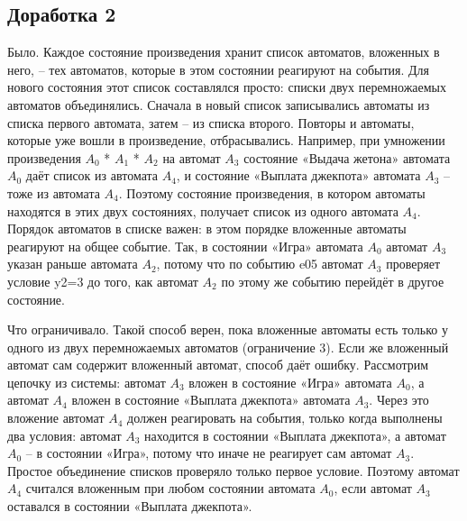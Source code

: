 \documentclass[12pt]{article}
\begin{document}
\subsection*{Доработка 2}

Было. Каждое состояние произведения хранит список автоматов, вложенных в него, – тех автоматов, которые в этом состоянии реагируют на события. Для нового состояния этот список составлялся просто: списки двух перемножаемых автоматов объединялись. Сначала в новый список записывались автоматы из списка первого автомата, затем – из списка второго. Повторы и автоматы, которые уже вошли в произведение, отбрасывались. Например, при умножении произведения $A_{0}$ * $A_{1}$ * $A_{2}$ на автомат $A_{3}$ состояние «Выдача жетона» автомата $A_{0}$ даёт список из автомата $A_{4}$, и состояние «Выплата джекпота» автомата $A_{3}$ – тоже из автомата $A_{4}$. Поэтому состояние произведения, в котором автоматы находятся в этих двух состояниях, получает список из одного автомата $A_{4}$. Порядок автоматов в списке важен: в этом порядке вложенные автоматы реагируют на общее событие. Так, в состоянии «Игра» автомата $A_{0}$ автомат $A_{3}$ указан раньше автомата $A_{2}$, потому что по событию e05 автомат $A_{3}$ проверяет условие y2=3 до того, как автомат $A_{2}$ по этому же событию перейдёт в другое состояние.

Что ограничивало. Такой способ верен, пока вложенные автоматы есть только у одного из двух перемножаемых автоматов (ограничение 3). Если же вложенный автомат сам содержит вложенный автомат, способ даёт ошибку. Рассмотрим цепочку из системы: автомат $A_{3}$ вложен в состояние «Игра» автомата $A_{0}$, а автомат $A_{4}$ вложен в состояние «Выплата джекпота» автомата $A_{3}$. Через это вложение автомат $A_{4}$ должен реагировать на события, только когда выполнены два условия: автомат $A_{3}$ находится в состоянии «Выплата джекпота», а автомат $A_{0}$ – в состоянии «Игра», потому что иначе не реагирует сам автомат $A_{3}$. Простое объединение списков проверяло только первое условие. Поэтому автомат $A_{4}$ считался вложенным при любом состоянии автомата $A_{0}$, если автомат $A_{3}$ оставался в состоянии «Выплата джекпота».
\end{document}
